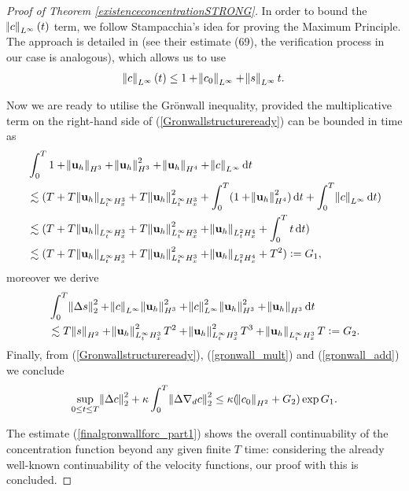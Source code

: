 \documentclass[11pt, a4paper]{article}
\newcommand*\diff{\mathop{}\!\mathrm{d}}
\begin{document}
\begin{proof}[Proof of Theorem \ref{existenceconcentrationSTRONG}]
In order to bound the $\norm{c}_{L^\infty} (t)$ term, we follow Stampacchia's idea for proving the Maximum Principle. The approach is detailed in \cite{cao2012global} (see their estimate (69), the verification process in our case is analogous), which allows us to use
%
$$\norm{c}_{L^\infty} (t) \leq 1 + \norm{c_0}_{L^\infty} + \norm{s}_{L^\infty} t.$$

Now we are ready to utilise the Gr\"onwall inequality, provided the multiplicative term on the right-hand side of (\ref{Gronwallstructureready}) can be bounded in time as
%
\begin{equation} \label{gronwall_mult}
\begin{split}
& \int_0^T 1 + \norm{\mathbf{u}_h}_{H^3} + \norm{\mathbf{u}_h}_{H^3}^2 + \norm{\mathbf{u}_h}_{H^4} + \norm{c}_{L^\infty} \diff t \\
& \lesssim (T + T\norm{\mathbf{u}_h}_{L^\infty_t H^3_x} + T \norm{\mathbf{u}_h}_{L^\infty_t H^3_x}^2 + \int_0^T (1 + \norm{\mathbf{u}_h}_{H^4}^2) \diff t + \int_0^T \norm{c}_{L^\infty} \diff t )\\
& \lesssim (T + T\norm{\mathbf{u}_h}_{L^\infty_t H^3_x} + T \norm{\mathbf{u}_h}_{L^\infty_t H^3_x}^2 + \norm{\mathbf{u}_h}_{L^2_t H^4_x} + \int_0^T t \diff t )\\
& \lesssim (T + T\norm{\mathbf{u}_h}_{L^\infty_t H^3_x} + T \norm{\mathbf{u}_h}_{L^\infty_t H^3_x}^2 + \norm{\mathbf{u}_h}_{L^2_t H^4_x} + T^2) : = G_1,
\end{split}
\end{equation}
%
moreover we derive
%
\begin{equation} \label{gronwall_add}
\begin{split}
& \int_0^T \norm{\Delta s}_2^2 + \norm{c}_{L^\infty} \norm{\mathbf{u}_h}_{H^3}^2 + \norm{c}_{L^\infty}^2 \norm{\mathbf{u}_h}_{H^3}^2 + \norm{\mathbf{u}_h}_{H^3} \diff t\\
& \lesssim T \norm{s}_{H^2} + \norm{\mathbf{u}_h}_{L^\infty_t H^3_x}^2 T^2 + \norm{\mathbf{u}_h}_{L^\infty_t H^3_x}^2 T^3 + \norm{\mathbf{u}_h}_{L^\infty_t H^3_x} T := G_2.
\end{split}
\end{equation}
%
Finally, from (\ref{Gronwallstructureready}), (\ref{gronwall_mult}) and (\ref{gronwall_add}) we conclude
%
\begin{equation} \label{finalgronwallforc_part1}
\sup_{0 \leq t \leq T}\norm{\Delta c}_2^2 + \kappa \int_0^T \norm{\Delta \nabla_d c}_2^2 \leq \kappa (\norm{c_0}_{H^2} + G_2) \exp{G_1}.
\end{equation}

The estimate (\ref{finalgronwallforc_part1}) shows the overall continuability of the concentration function beyond any given finite $T$ time: considering the already well-known continuability of the velocity functions, our proof with this is concluded.

\end{proof}
\end{document}
